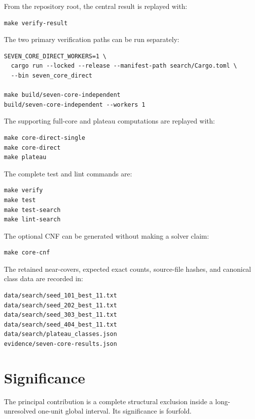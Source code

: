 \documentclass[11pt]{article}
\begin{document}
From the repository root, the central result is replayed with:

\begin{Verbatim}[fontsize=\small]
make verify-result
\end{Verbatim}

The two primary verification paths can be run separately:

\begin{Verbatim}[fontsize=\small]
SEVEN_CORE_DIRECT_WORKERS=1 \
  cargo run --locked --release --manifest-path search/Cargo.toml \
  --bin seven_core_direct

make build/seven-core-independent
build/seven-core-independent --workers 1
\end{Verbatim}

The supporting full-core and plateau computations are replayed with:

\begin{Verbatim}[fontsize=\small]
make core-direct-single
make core-direct
make plateau
\end{Verbatim}

The complete test and lint commands are:

\begin{Verbatim}[fontsize=\small]
make verify
make test
make test-search
make lint-search
\end{Verbatim}

The optional CNF can be generated without making a solver claim:

\begin{Verbatim}[fontsize=\small]
make core-cnf
\end{Verbatim}

The retained near-covers, expected exact counts, source-file hashes, and
canonical class data are recorded in:

\begin{Verbatim}[fontsize=\small]
data/search/seed_101_best_11.txt
data/search/seed_202_best_11.txt
data/search/seed_303_best_11.txt
data/search/seed_404_best_11.txt
data/search/plateau_classes.json
evidence/seven-core-results.json
\end{Verbatim}

\section{Significance}

The principal contribution is a complete structural exclusion inside a
long-unresolved one-unit global interval.  Its significance is fourfold.
\end{document}
